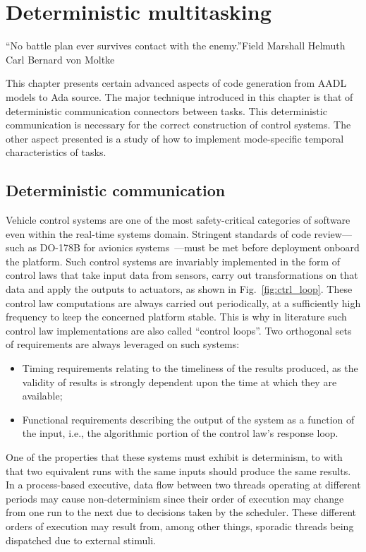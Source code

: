\chapter{Deterministic multitasking}{``No battle plan ever survives contact with the
  enemy.''}{Field Marshall Helmuth Carl Bernard von Moltke}
\label{chap:adv_code}

This chapter presents certain advanced aspects of code generation from
AADL models to Ada source. The major technique introduced in this
chapter is that of deterministic communication connectors between
tasks. This deterministic communication is necessary for the correct
construction of control systems. The other aspect presented is a study
of how to implement mode-specific temporal characteristics of tasks.

\section{Deterministic communication}
Vehicle control systems are one of the most safety-critical categories
of software even within the real-time systems domain. Stringent
standards of code review---such as DO-178B for avionics
systems~\cite{do178b}---must be met before deployment onboard the
platform. Such control systems are invariably implemented in the form
of control laws that take input data from sensors, carry out
transformations on that data and apply the outputs to actuators, as
shown in Fig.~\ref{fig:ctrl_loop}. These control law computations are
always carried out periodically, at a sufficiently high frequency to
keep the concerned platform stable. This is why in literature such
control law implementations are also called ``control loops''. Two
orthogonal sets of requirements are always leveraged on such systems:

\begin{itemize}
\item{Timing requirements relating to the timeliness of the results
  produced, as the validity of results is strongly dependent upon the
  time at which they are available;}
\item{Functional requirements describing the output of the system as a
  function of the input, i.e., the algorithmic portion of the control
  law's response loop.}
\end{itemize}

One of the properties that these systems must exhibit is determinism,
to with that two equivalent runs with the same inputs should produce
the same results. In a process-based executive, data flow between two
threads operating at different periods may cause non-determinism since
their order of execution may change from one run to the next due to
decisions taken by the scheduler. These different orders of execution
may result from, among other things, sporadic threads being dispatched
due to external stimuli.

